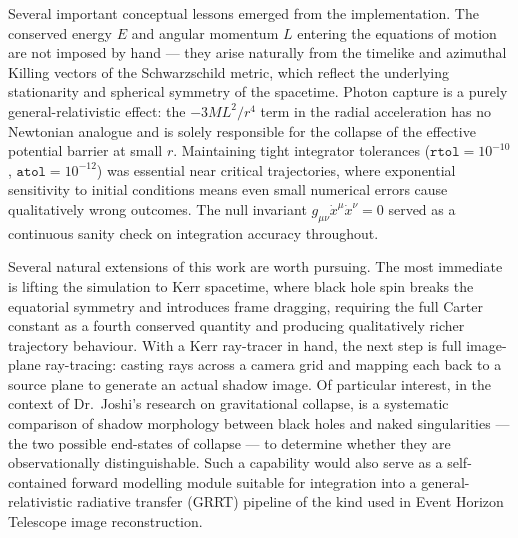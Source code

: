 \documentclass[12pt,a4paper]{article}
\begin{document}
Several important conceptual lessons emerged from the implementation. The conserved energy $E$
and angular momentum $L$ entering the equations of motion are not imposed by hand --- they
arise naturally from the timelike and azimuthal Killing vectors of the Schwarzschild metric,
which reflect the underlying stationarity and spherical symmetry of the spacetime. Photon
capture is a purely general-relativistic effect: the $-3ML^2/r^4$ term in the radial
acceleration has no Newtonian analogue and is solely responsible for the collapse of the
effective potential barrier at small $r$. Maintaining tight integrator tolerances
($\texttt{rtol} = 10^{-10}$, $\texttt{atol} = 10^{-12}$) was essential near critical
trajectories, where exponential sensitivity to initial conditions means even small numerical
errors cause qualitatively wrong outcomes. The null invariant $g_{\mu\nu}\dot{x}^\mu
\dot{x}^\nu = 0$ served as a continuous sanity check on integration accuracy throughout.

Several natural extensions of this work are worth pursuing. The most immediate is lifting the
simulation to Kerr spacetime, where black hole spin breaks the equatorial symmetry and
introduces frame dragging, requiring the full Carter constant as a fourth conserved quantity
and producing qualitatively richer trajectory behaviour. With a Kerr ray-tracer in hand, the
next step is full image-plane ray-tracing: casting rays across a camera grid and mapping each
back to a source plane to generate an actual shadow image. Of particular interest, in the
context of Dr.~Joshi's research on gravitational collapse, is a systematic comparison of shadow
morphology between black holes and naked singularities --- the two possible end-states of
collapse --- to determine whether they are observationally distinguishable. Such a capability
would also serve as a self-contained forward modelling module suitable for integration into a
general-relativistic radiative transfer (GRRT) pipeline of the kind used in Event Horizon
Telescope image reconstruction.

\newpage


\end{document}
